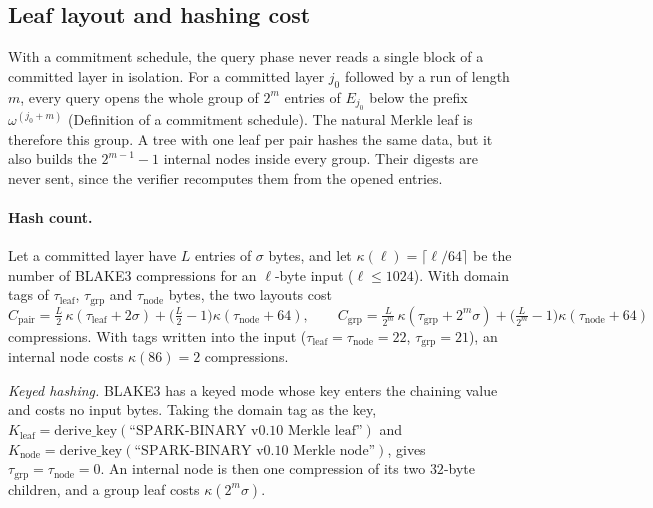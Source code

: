 \subsection{Leaf layout and hashing cost}
\label{sec:block-leaves}

With a commitment schedule, the query phase never reads a single block of a committed layer in
isolation. For a committed layer $j_0$ followed by a run of length $m$, every query opens the whole
group of $2^m$ entries of $E_{j_0}$ below the prefix $\omega^{(j_0+m)}$
(Definition of a commitment schedule). The natural Merkle leaf is therefore this group. A tree with
one leaf per pair hashes the same data, but it also builds the $2^{m-1}-1$ internal nodes inside
every group. Their digests are never sent, since the verifier recomputes them from the opened entries.

\paragraph{Hash count.} Let a committed layer have $L$ entries of $\sigma$ bytes, and let
$\kappa(\ell)=\lceil \ell/64\rceil$ be the number of BLAKE3 compressions for an $\ell$-byte input
($\ell\le1024$). With domain tags of $\tau_{\mathrm{leaf}}$, $\tau_{\mathrm{grp}}$ and
$\tau_{\mathrm{node}}$ bytes, the two layouts cost
\[
C_{\mathrm{pair}}=\tfrac{L}{2}\,\kappa(\tau_{\mathrm{leaf}}+2\sigma)+\bigl(\tfrac{L}{2}-1\bigr)\kappa(\tau_{\mathrm{node}}+64),
\qquad
C_{\mathrm{grp}}=\tfrac{L}{2^m}\,\kappa(\tau_{\mathrm{grp}}+2^m\sigma)+\bigl(\tfrac{L}{2^m}-1\bigr)\kappa(\tau_{\mathrm{node}}+64)
\]
compressions. With tags written into the input ($\tau_{\mathrm{leaf}}=\tau_{\mathrm{node}}=22$,
$\tau_{\mathrm{grp}}=21$), an internal node costs $\kappa(86)=2$ compressions.

\emph{Keyed hashing.} BLAKE3 has a keyed mode whose key enters the chaining value and costs no
input bytes. Taking the domain tag as the key, $K_{\mathrm{leaf}}=\mathrm{derive\_key}(\text{``SPARK-BINARY v0.10 Merkle leaf''})$ and
$K_{\mathrm{node}}=\mathrm{derive\_key}(\text{``SPARK-BINARY v0.10 Merkle node''})$, gives
$\tau_{\mathrm{grp}}=\tau_{\mathrm{node}}=0$. An internal node is then one compression of its two
$32$-byte children, and a group leaf costs $\kappa(2^m\sigma)$.

